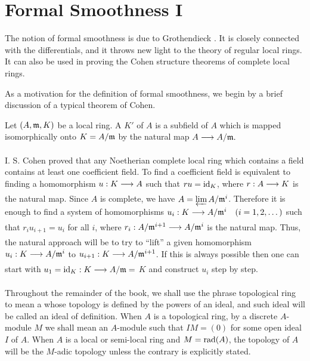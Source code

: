 \documentclass[../main]{subfiles}
\begin{document}
\section{Formal Smoothness I}\label{sec:28}

\newparagraph The notion of formal smoothness is due to Grothendieck \cite{egaIV}. It is closely connected with the differentials, and it throws new light to the theory of regular local rings. It can also be used in proving the Cohen structure theorems of complete local rings.

As a motivation for the definition of formal smoothness, we begin by a brief discussion of a typical theorem of Cohen.
\begin{definition}
Let $(A, \mathfrak{m}, K)$ be a local ring. A  $K'$ of $A$ is a subfield of $A$ which is mapped isomorphically onto $K=A / \mathfrak{m}$ by the natural map \newline $A \varrightarrow{} A/\ideal{m} .$
\end{definition}

I. S. Cohen proved that any Noetherian complete local ring which contains a field contains at least one coefficient field. To find a coefficient field is equivalent to finding a homomorphism $u: K \varrightarrow{} A$ such that $r u=\operatorname{id}_K$, where $r: A \varrightarrow{} K$ is the natural map. Since $A$ is complete, we have $A=\varprojlim A/\mathfrak{m}^i$. Therefore it is enough to find a system of homomorphisms $u_i: K \varrightarrow{} A/\ideal{m}^i\for{i=1,2, \ldots}$ such that $r_i u_{i+1}=u_i$ for all $i$, where $r_i: A / \ideal{m}^{i+1} \varrightarrow{} A / \ideal{m}^i$ is the natural map. Thus, the natural approach will be to try to ``lift'' a given homomorphism $u_i: K \varrightarrow{} A/\ideal{m}^i$ to $u_{i+1}: K \varrightarrow{} A/\ideal{m}^{i+1}$. If this is always possible then one can start with $u_1=\id_K: K \varrightarrow{} A/\ideal{m}=$ $K$ and construct $u_i$ step by step.

\begin{parconvention}
Throughout the remainder of the book, we shall use the phrase topological ring to mean a  whose topology is defined by the powers of an ideal, and such ideal will be called an ideal of definition. When $A$ is a topological ring, by a discrete $A$-module $M$ we shall mean an $A$-module such that $I M=(0)$ for some open ideal $I$ of $A$. When $A$ is a local or semi-local ring and $M=\operatorname{rad}(A)$, the topology of $A$ will be the $M$-adic topology unless the contrary is explicitly stated.
\end{parconvention} 
\end{document}
